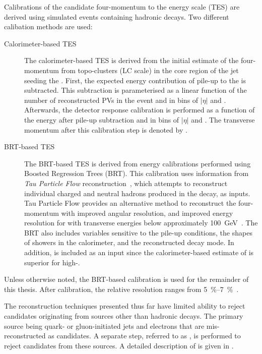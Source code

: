 Calibrations of the \tauhadvis candidate four-momentum to the \tauhadvis energy
scale (TES) are derived using simulated events containing hadronic \taulepton
decays. Two different calibation methods are used:
\begin{description}

\item[Calorimeter-based TES] The calorimeter-based TES is derived from the
  initial estimate of the \tauhadvis four-momentum from topo-clusters (LC scale)
  in the core region of the jet seeding the \tauhadvis. First, the expected
  energy contribution of pile-up to the \tauhadvis is subtracted. This
  subtraction is parameterised as a linear function of the number of
  reconstructed PVs in the event and in bins of \tauhadvis $|\eta|$ and
  \Ntracks. Afterwards, the detector response calibration is performed as a
  function of the \tauhadvis energy after pile-up subtraction and in bins of
  \tauhadvis $|\eta|$ and \Ntracks. The \tauhadvis transverse momentum after
  this calibration step is denoted by \pTLC.

\item[BRT-based TES] The BRT-based TES is derived from \tauhadvis energy
  calibrations performed using Boosted Regression Trees (BRT). This calibration
  uses information from \emph{Tau Particle Flow}
  reconstruction~\cite{PERF-2014-06}, which attempts to reconstruct individual
  charged and neutral hadrons produced in the \taulepton decay, as inputs. Tau
  Particle Flow provides an alternative method to reconstruct the \tauhadvis
  four-momentum with improved angular resolution, and improved energy resolution
  for \tauhadvis with transverse energies below approximately
  \SI{100}{\GeV}~\cite{PERF-2014-06}. The BRT also includes variables sensitive
  to the pile-up conditions, the shapes of showers in the calorimeter, and the
  reconstructed \taulepton decay mode. In addition, \pTLC is included as an
  input since the calorimeter-based estimate of \tauhadvis \pT is superior for
  high-\pT \tauhadvis.

\end{description}
Unless otherwise noted, the BRT-based calibration is used for the remainder of
this thesis. After calibration, the relative \tauhadvis \pT resolution ranges
from \SIrange{5}{7}{\percent}~\cite{ATLAS-CONF-2017-029}.

The \tauhadvis reconstruction techniques presented thus far have limited ability
to reject \tauhadvis candidates originating from sources other than hadronic
\taulepton decays. The primary source being quark- or gluon-initiated jets and
electrons that are mis-reconstructed as \tauhadvis candidates. A separate step,
referred to as \tauid, is performed to reject \tauhadvis candidates from these
sources. A detailed description of \tauid is given in .


